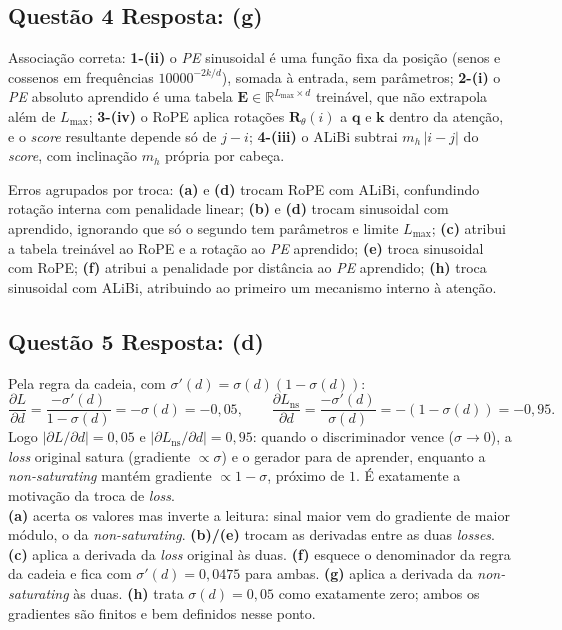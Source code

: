 \documentclass[11pt,a4paper]{article}
\begin{document}
\subsection*{Questão 4 \textemdash{} Resposta: (g)}
Associação correta: \textbf{1-(ii)} o \textit{PE} sinusoidal é uma função fixa da posição (senos e cossenos em frequências $10000^{-2k/d}$), somada à entrada, sem parâmetros; \textbf{2-(i)} o \textit{PE} absoluto aprendido é uma tabela $\mathbf{E} \in \mathbb{R}^{L_{\text{max}} \times d}$ treinável, que não extrapola além de $L_{\text{max}}$; \textbf{3-(iv)} o RoPE aplica rotações $\mathbf{R}_\theta(i)$ a $\mathbf{q}$ e $\mathbf{k}$ dentro da atenção, e o \textit{score} resultante depende só de $j - i$; \textbf{4-(iii)} o ALiBi subtrai $m_h\,|i - j|$ do \textit{score}, com inclinação $m_h$ própria por cabeça.

Erros agrupados por troca: \textbf{(a)} e \textbf{(d)} trocam RoPE com ALiBi, confundindo rotação interna com penalidade linear; \textbf{(b)} e \textbf{(d)} trocam sinusoidal com aprendido, ignorando que só o segundo tem parâmetros e limite $L_{\text{max}}$; \textbf{(c)} atribui a tabela treinável ao RoPE e a rotação ao \textit{PE} aprendido; \textbf{(e)} troca sinusoidal com RoPE; \textbf{(f)} atribui a penalidade por distância ao \textit{PE} aprendido; \textbf{(h)} troca sinusoidal com ALiBi, atribuindo ao primeiro um mecanismo interno à atenção.

\subsection*{Questão 5 \textemdash{} Resposta: (d)}
Pela regra da cadeia, com $\sigma'(d) = \sigma(d)(1 - \sigma(d))$:
\[
\frac{\partial L}{\partial d} = \frac{-\sigma'(d)}{1 - \sigma(d)} = -\sigma(d) = -0{,}05, \qquad
\frac{\partial L_{\text{ns}}}{\partial d} = \frac{-\sigma'(d)}{\sigma(d)} = -(1 - \sigma(d)) = -0{,}95.
\]
Logo $\left|\partial L / \partial d\right| = 0{,}05$ e $\left|\partial L_{\text{ns}} / \partial d\right| = 0{,}95$: quando o discriminador vence ($\sigma \to 0$), a \textit{loss} original satura (gradiente $\propto \sigma$) e o gerador para de aprender, enquanto a \textit{non-saturating} mantém gradiente $\propto 1 - \sigma$, próximo de $1$. É exatamente a motivação da troca de \textit{loss}.\\
\textbf{(a)} acerta os valores mas inverte a leitura: sinal maior vem do gradiente de maior módulo, o da \textit{non-saturating}.
\textbf{(b)/(e)} trocam as derivadas entre as duas \textit{losses}.
\textbf{(c)} aplica a derivada da \textit{loss} original às duas.
\textbf{(f)} esquece o denominador da regra da cadeia e fica com $\sigma'(d) = 0{,}0475$ para ambas.
\textbf{(g)} aplica a derivada da \textit{non-saturating} às duas.
\textbf{(h)} trata $\sigma(d) = 0{,}05$ como exatamente zero; ambos os gradientes são finitos e bem definidos nesse ponto.
\end{document}
